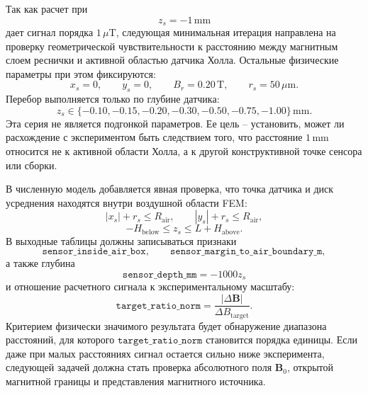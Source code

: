 \documentclass[12pt,a4paper]{article}
\begin{document}
Так как расчет при
\[
    z_s=-1\,\mathrm{mm}
\]
дает сигнал порядка \(1\,\mu\mathrm{T}\), следующая минимальная итерация
направлена на проверку геометрической чувствительности к расстоянию между
магнитным слоем реснички и активной областью датчика Холла. Остальные
физические параметры при этом фиксируются:
\[
    x_s=0,\qquad y_s=0,\qquad B_r=0.20\,\mathrm{T},
    \qquad r_s=50\,\mu\mathrm{m}.
\]
Перебор выполняется только по глубине датчика:
\[
    z_s\in
    \{-0.10,-0.15,-0.20,-0.30,-0.50,-0.75,-1.00\}\,\mathrm{mm}.
\]
Эта серия не является подгонкой параметров. Ее цель -- установить, может ли
расхождение с экспериментом быть следствием того, что расстояние
\(1\,\mathrm{mm}\) относится не к активной области Холла, а к другой
конструктивной точке сенсора или сборки.

В численную модель добавляется явная проверка, что точка датчика и диск
усреднения находятся внутри воздушной области FEM:
\[
    |x_s|+r_s\le R_{\mathrm{air}},
    \qquad
    |y_s|+r_s\le R_{\mathrm{air}},
\]
\[
    -H_{\mathrm{below}}\le z_s\le L+H_{\mathrm{above}}.
\]
В выходные таблицы должны записываться признаки
\[
    \texttt{sensor\_inside\_air\_box},
    \qquad
    \texttt{sensor\_margin\_to\_air\_boundary\_m},
\]
а также глубина
\[
    \texttt{sensor\_depth\_mm}=-1000 z_s
\]
и отношение расчетного сигнала к экспериментальному масштабу:
\[
    \texttt{target\_ratio\_norm}
    =
    \frac{|\Delta\mathbf B|}
         {\Delta B_{\mathrm{target}}}.
\]
Критерием физически значимого результата будет обнаружение диапазона
расстояний, для которого \(\texttt{target\_ratio\_norm}\) становится порядка
единицы. Если даже при малых расстояниях сигнал остается сильно ниже
эксперимента, следующей задачей должна стать проверка абсолютного поля
\(\mathbf B_0\), открытой магнитной границы и представления магнитного
источника.
\end{document}
